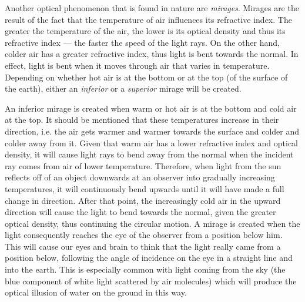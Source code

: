 
Another optical phenomenon that is found in nature are \emph{mirages}. Mirages are the result of the fact that the temperature of air influences its refractive index. The greater the temperature of the air, the lower is its optical density and thus its refractive index --- the faster the speed of the light rays. On the other hand, colder air has a greater refractive index, thus light is bent towards the normal. In effect, light is bent when it moves through air that varies in temperature. Depending on whether hot air is at the bottom or at the top (of the surface of the earth), either an \emph{inferior} or a \emph{superior} mirage will be created.


An inferior mirage is created when warm or hot air is at the bottom and cold air at the top. It should be mentioned that these temperatures increase in their direction, i.e. the air gets warmer and warmer towards the surface and colder and colder away from it. Given that warm air has a lower refractive index and optical density, it will cause light rays to bend away from the normal when the incident ray comes from air of lower temperature. Therefore, when light from the sun reflects off of an object downwards at an observer into gradually increasing temperatures, it will continuously bend upwards until it will have made a full change in direction. After that point, the increasingly cold air in the upward direction will cause the light to bend towards the normal, given the greater optical density, thus continuing the circular motion. A mirage is created when the light consequently reaches the eye of the observer from a position below him. This will cause our eyes and brain to think that the light really came from a position below, following the angle of incidence on the eye in a straight line and into the earth. This is especially common with light coming from the sky (the blue component of white light scattered by air molecules) which will produce the optical illusion of water on the ground in this way.

